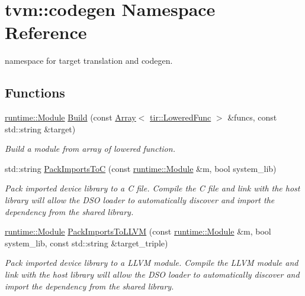 \hypertarget{namespacetvm_1_1codegen}{}\section{tvm\+:\+:codegen Namespace Reference}
\label{namespacetvm_1_1codegen}


namespace for target translation and codegen.  


\subsection*{Functions}
\begin{DoxyCompactItemize}
\item 
\hyperlink{classtvm_1_1runtime_1_1Module}{runtime\+::\+Module} \hyperlink{namespacetvm_1_1codegen_ad59f6371549d077dbd0c291b90f5cdf3}{Build} (const \hyperlink{classtvm_1_1Array}{Array}$<$ \hyperlink{classtvm_1_1tir_1_1LoweredFunc}{tir\+::\+Lowered\+Func} $>$ \&funcs, const std\+::string \&target)
\begin{DoxyCompactList}\small\item\em Build a module from array of lowered function. \end{DoxyCompactList}\item 
std\+::string \hyperlink{namespacetvm_1_1codegen_abf02059ebadcdb8bbbe5c840b646d67b}{Pack\+Imports\+ToC} (const \hyperlink{classtvm_1_1runtime_1_1Module}{runtime\+::\+Module} \&m, bool system\+\_\+lib)
\begin{DoxyCompactList}\small\item\em Pack imported device library to a C file. Compile the C file and link with the host library will allow the D\+SO loader to automatically discover and import the dependency from the shared library. \end{DoxyCompactList}\item 
\hyperlink{classtvm_1_1runtime_1_1Module}{runtime\+::\+Module} \hyperlink{namespacetvm_1_1codegen_ab2cd2a65bac4b26427a8ca0abe4e0bd6}{Pack\+Imports\+To\+L\+L\+VM} (const \hyperlink{classtvm_1_1runtime_1_1Module}{runtime\+::\+Module} \&m, bool system\+\_\+lib, const std\+::string \&target\+\_\+triple)
\begin{DoxyCompactList}\small\item\em Pack imported device library to a L\+L\+VM module. Compile the L\+L\+VM module and link with the host library will allow the D\+SO loader to automatically discover and import the dependency from the shared library. \end{DoxyCompactList}\end{DoxyCompactItemize}


